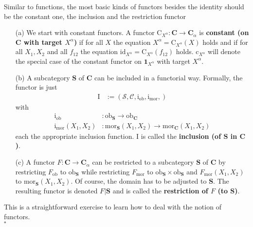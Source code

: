\begin{exa}
\label{exa:basicsfuncs1}
Similar to functions, the most basic kinds of functors besides the identity should be the constant one, the inclusion and the restriction functor
\begin{enumerate}
\item[(a)]
We start with constant functors. A functor $\mathrm{C}_{X^{\alpha}} \colon \mathbf{C} \rightarrow \mathbf{C}_{\alpha}$ is \textbf{constant (on $\mathbf{C}$ with target $X^{\alpha}$)} if for all $X$ the equation $X^{\alpha} = \mathrm{C}_{X^{\alpha}}(X)$ holds and if for all $X_{1},X_{2}$ and all $f_{12}$ the equation $\mathrm{id}_{X^{\alpha}} = \mathrm{C}_{X^{\alpha}}(f_{12})$ holds. $\mathrm{c}_{X^{\alpha}}$ will denote the special case of the constant functor on $\mathbf{1}_{X^{\alpha}}$ with target $X^{\alpha}$.
\item[(b)]
A subcategory $\mathbf{S}$ of $\mathbf{C}$ can be included in a functorial way. Formally, the functor is just
\begin{align*}
  \mathrm{I}
  &:=
  \left(
    \mathcal{S},
    \mathcal{C},
    \mathrm{i}_{\mathrm{ob}},
    \mathrm{i}_{\mathrm{mor}},
  \right)
\end{align*}
with
\begin{align*}
  \mathrm{i}_{\mathrm{ob}}
  &\colon
  \mathrm{ob}_{\mathbf{S}}
  \rightarrow
  \mathrm{ob}_{\mathbf{C}}
  \\
  \mathrm{i}_{\mathrm{mor}}(X_{1},X_{2})
  &\colon
  \mathrm{mor}_{\mathbf{S}}(X_{1},X_{2})
  \rightarrow
  \mathrm{mor}_{\mathbf{C}}(X_{1},X_{2})
\end{align*}
each the appropriate inclusion function. $\mathrm{I}$ is called the \textbf{inclusion (of $\mathbf{S}$ in $\mathbf{C}$)}.
\item[(c)]
A functor $F \colon \mathbf{C} \rightarrow \mathbf{C}_{\alpha}$ can be restricted to a subcategory $\mathbf{S}$ of $\mathbf{C}$ by restricting $F_{\mathrm{ob}}$ to $\mathrm{ob}_{\mathbf{S}}$ while restricting $F_{\mathrm{mor}}$ to $\mathrm{ob}_{\mathbf{S}} \times \mathrm{ob}_{\mathbf{S}}$ and $F_{\mathrm{mor}}(X_{1},X_{2})$ to $\mathrm{mor}_{\mathbf{S}}(X_{1},X_{2})$. Of course, the domain has to be adjusted to $\mathbf{S}$. The resulting functor is denoted $F \vert \mathbf{S}$ and is called the \textbf{restriction of $F$ (to $\mathbf{S}$)}.
\end{enumerate}
\end{exa}
\begin{prf}
This is a straightforward exercise to learn how to deal with the notion of functors.
\\
\phantom{proven}
\hfill
$\square$
\end{prf}
